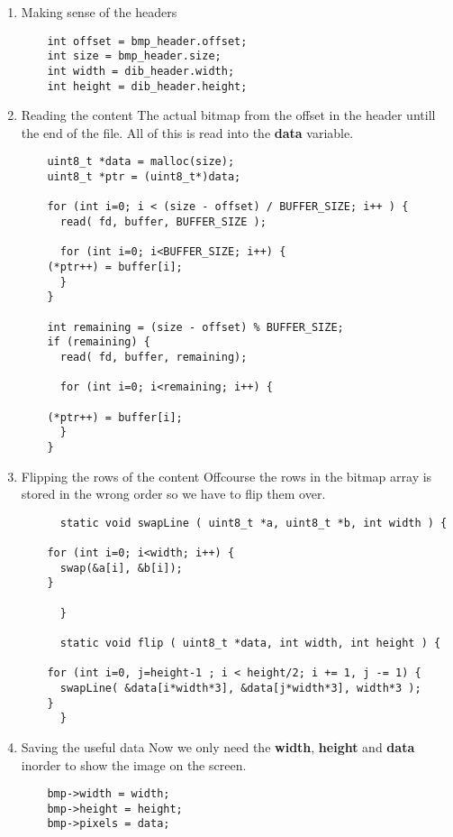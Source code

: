 \begin{enumerate}
\begin{lstlisting}
    }
  \end{lstlisting}

\item Making sense of the headers
  \begin{lstlisting}
    int offset = bmp_header.offset;
    int size = bmp_header.size;
    int width = dib_header.width;
    int height = dib_header.height;
  \end{lstlisting}
\item Reading the content \newline
The actual bitmap from the offset in the header untill the end of the
file. All of this is read into the {\bf data} variable.
  \begin{lstlisting}
    uint8_t *data = malloc(size);
    uint8_t *ptr = (uint8_t*)data;

    for (int i=0; i < (size - offset) / BUFFER_SIZE; i++ ) {
      read( fd, buffer, BUFFER_SIZE );

      for (int i=0; i<BUFFER_SIZE; i++) {
	(*ptr++) = buffer[i];
      }
    }

    int remaining = (size - offset) % BUFFER_SIZE;
    if (remaining) {
      read( fd, buffer, remaining);

      for (int i=0; i<remaining; i++) {

	(*ptr++) = buffer[i];
      }
    }
  \end{lstlisting}

  \item Flipping the rows of the content \newline
Offcourse the rows in the bitmap array is stored in the wrong order so
we have to flip them over.
    \begin{lstlisting}
      static void swapLine ( uint8_t *a, uint8_t *b, int width ) {

	for (int i=0; i<width; i++) {
	  swap(&a[i], &b[i]);
	}

      }

      static void flip ( uint8_t *data, int width, int height ) {

	for (int i=0, j=height-1 ; i < height/2; i += 1, j -= 1) {
	  swapLine( &data[i*width*3], &data[j*width*3], width*3 );
	}
      }
    \end{lstlisting}
  \item Saving the useful data\newline
Now we only need the {\bf width}, {\bf height} and {\bf data} inorder
to show the image on the screen.
    \begin{lstlisting}
	bmp->width = width;
	bmp->height = height;
	bmp->pixels = data;
    \end{lstlisting}
\end{enumerate}


